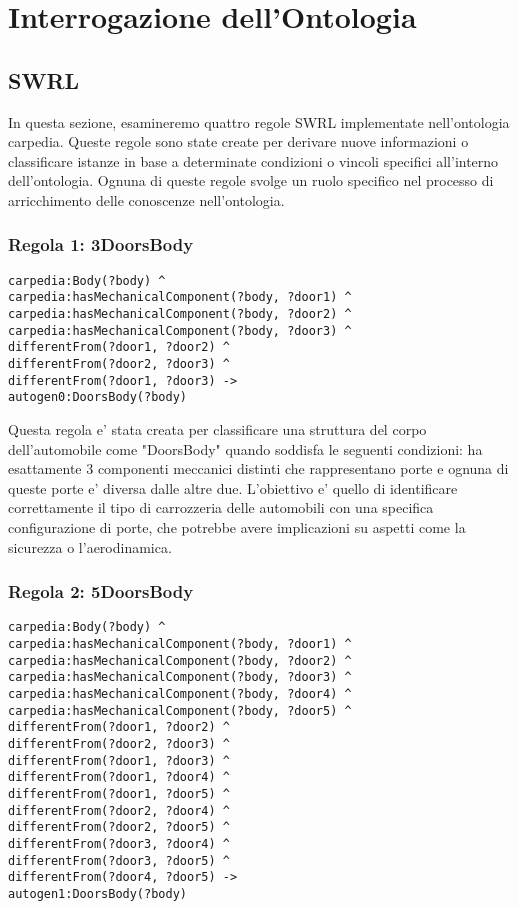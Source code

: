 \chapter{Interrogazione dell'Ontologia}

\section{SWRL}\label{sec:swrl}
In questa sezione, esamineremo quattro regole SWRL implementate nell'ontologia carpedia.
Queste regole sono state create per derivare nuove informazioni o classificare istanze in base a determinate
condizioni o vincoli specifici all'interno dell'ontologia.
Ognuna di queste regole svolge un ruolo specifico nel processo di arricchimento delle conoscenze nell'ontologia.

\subsection{Regola 1: 3DoorsBody}

\begin{verbatim}
carpedia:Body(?body) ^
carpedia:hasMechanicalComponent(?body, ?door1) ^
carpedia:hasMechanicalComponent(?body, ?door2) ^
carpedia:hasMechanicalComponent(?body, ?door3) ^
differentFrom(?door1, ?door2) ^
differentFrom(?door2, ?door3) ^
differentFrom(?door1, ?door3) ->
autogen0:DoorsBody(?body)
\end{verbatim}


Questa regola e' stata creata per classificare una struttura del corpo dell'automobile come "DoorsBody" quando
soddisfa le seguenti condizioni: ha esattamente 3 componenti meccanici distinti che rappresentano porte e ognuna
di queste porte e' diversa dalle altre due.
L'obiettivo e' quello di identificare correttamente il tipo di carrozzeria delle automobili con una
specifica configurazione di porte, che potrebbe avere implicazioni su aspetti come la sicurezza o l'aerodinamica.

\subsection{Regola 2: 5DoorsBody}

\begin{verbatim}
carpedia:Body(?body) ^
carpedia:hasMechanicalComponent(?body, ?door1) ^
carpedia:hasMechanicalComponent(?body, ?door2) ^
carpedia:hasMechanicalComponent(?body, ?door3) ^
carpedia:hasMechanicalComponent(?body, ?door4) ^
carpedia:hasMechanicalComponent(?body, ?door5) ^
differentFrom(?door1, ?door2) ^
differentFrom(?door2, ?door3) ^
differentFrom(?door1, ?door3) ^
differentFrom(?door1, ?door4) ^
differentFrom(?door1, ?door5) ^
differentFrom(?door2, ?door4) ^
differentFrom(?door2, ?door5) ^
differentFrom(?door3, ?door4) ^
differentFrom(?door3, ?door5) ^
differentFrom(?door4, ?door5) ->
autogen1:DoorsBody(?body)
\end{verbatim}


